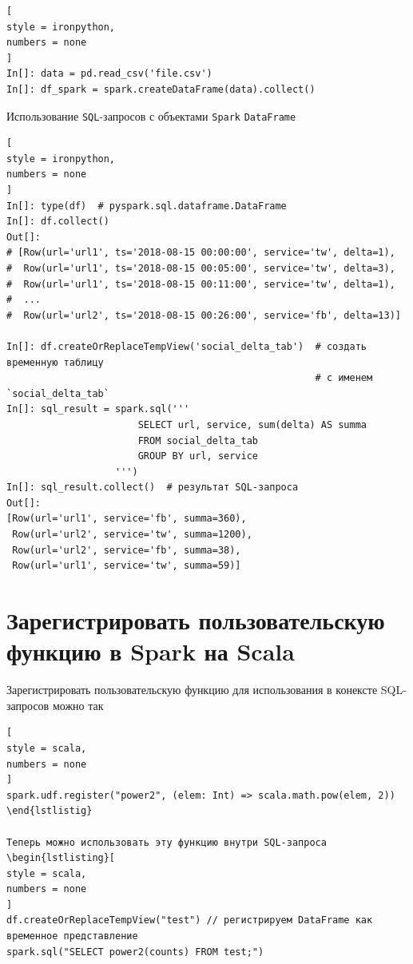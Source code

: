 \documentclass[%
	11pt,
	a4paper,
	utf8,
		]{article}
\begin{document}
\begin{lstlisting}[
style = ironpython,
numbers = none
]
In[]: data = pd.read_csv('file.csv')
In[]: df_spark = spark.createDataFrame(data).collect()
\end{lstlisting}


Использование \texttt{SQL}-запросов с объектами \texttt{Spark} \texttt{DataFrame}

\begin{lstlisting}[
style = ironpython,
numbers = none
]
In[]: type(df)  # pyspark.sql.dataframe.DataFrame
In[]: df.collect()
Out[]:
# [Row(url='url1', ts='2018-08-15 00:00:00', service='tw', delta=1),
#  Row(url='url1', ts='2018-08-15 00:05:00', service='tw', delta=3),
#  Row(url='url1', ts='2018-08-15 00:11:00', service='tw', delta=1),
#  ...
#  Row(url='url2', ts='2018-08-15 00:26:00', service='fb', delta=13)]

In[]: df.createOrReplaceTempView('social_delta_tab')  # создать временную таблицу
                                                      # с именем `social_delta_tab`
In[]: sql_result = spark.sql('''
                       SELECT url, service, sum(delta) AS summa
                       FROM social_delta_tab
                       GROUP BY url, service
                   ''')
In[]: sql_result.collect()  # результат SQL-запроса
Out[]:
[Row(url='url1', service='fb', summa=360),
 Row(url='url2', service='tw', summa=1200),
 Row(url='url2', service='fb', summa=38),
 Row(url='url1', service='tw', summa=59)]
\end{lstlisting}


\section{Зарегистрировать пользовательскую функцию в Spark на Scala}

Зарегистрировать пользовательскую функцию для использования в конексте SQL-запросов можно так
\begin{lstlisting}[
style = scala,
numbers = none	
]
spark.udf.register("power2", (elem: Int) => scala.math.pow(elem, 2))
\end{lstlistig}

Теперь можно использовать эту функцию внутри SQL-запроса
\begin{lstlisting}[
style = scala,
numbers = none	
]
df.createOrReplaceTempView("test") // регистрируем DataFrame как временное представление
spark.sql("SELECT power2(counts) FROM test;")
\end{lstlisting}
\end{document}
